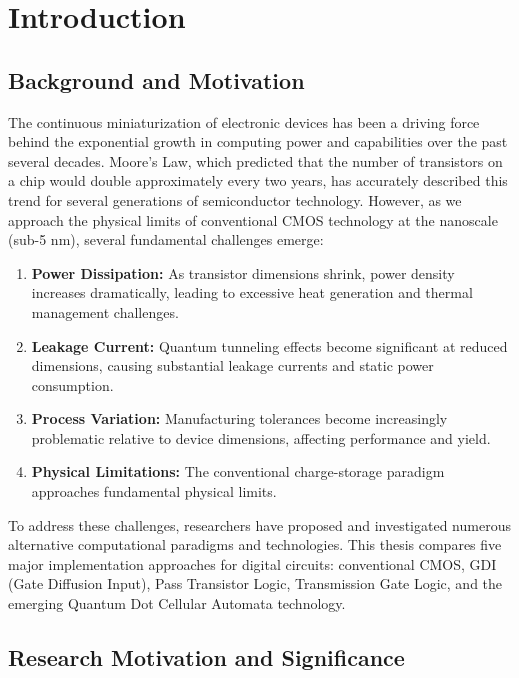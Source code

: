 \documentclass[12pt,a4paper,twoside]{report}
\begin{document}
\chapter{Introduction}
\label{ch:introduction}

\section{Background and Motivation}

The continuous miniaturization of electronic devices has been a driving force behind the exponential growth in computing power and capabilities over the past several decades. Moore's Law, which predicted that the number of transistors on a chip would double approximately every two years, has accurately described this trend for several generations of semiconductor technology. However, as we approach the physical limits of conventional CMOS technology at the nanoscale (sub-5 nm), several fundamental challenges emerge:

\begin{enumerate}
    \item \textbf{Power Dissipation:} As transistor dimensions shrink, power density increases dramatically, leading to excessive heat generation and thermal management challenges.
    \item \textbf{Leakage Current:} Quantum tunneling effects become significant at reduced dimensions, causing substantial leakage currents and static power consumption.
    \item \textbf{Process Variation:} Manufacturing tolerances become increasingly problematic relative to device dimensions, affecting performance and yield.
    \item \textbf{Physical Limitations:} The conventional charge-storage paradigm approaches fundamental physical limits.
\end{enumerate}

To address these challenges, researchers have proposed and investigated numerous alternative computational paradigms and technologies. This thesis compares five major implementation approaches for digital circuits: conventional CMOS, GDI (Gate Diffusion Input), Pass Transistor Logic, Transmission Gate Logic, and the emerging Quantum Dot Cellular Automata technology.

\section{Research Motivation and Significance}
\end{document}
